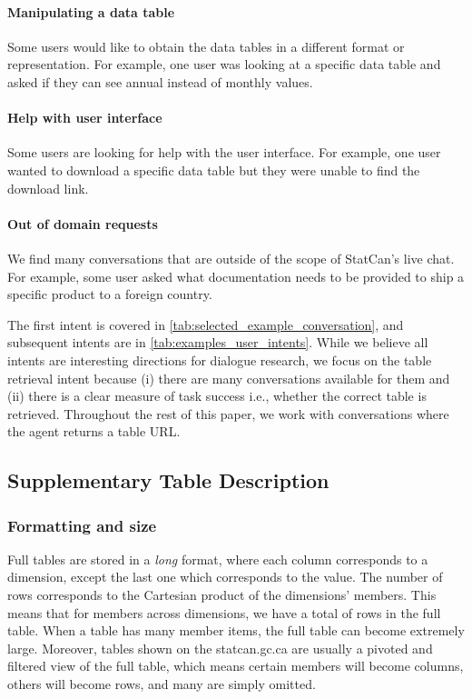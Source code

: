 \documentclass[11pt]{article}
\begin{document}
\paragraph{Manipulating a data table} Some users would like to obtain the data tables in a different format or representation. For example, one user was looking at a specific data table and asked if they can see annual instead of monthly values. 

\paragraph{Help with user interface} Some users are looking for help with the user interface. For example, one user wanted to download a specific data table but they were unable to find the download link. 

\paragraph{Out of domain requests} We find many conversations that are outside of the scope of StatCan's live chat. For example, some user asked what documentation needs to be provided to ship a specific product to a foreign country. 
\newline

The first intent is covered in \autoref{tab:selected_example_conversation}, and subsequent intents are in \autoref{tab:examples_user_intents}. While we believe all intents are interesting directions for dialogue research, we focus on the table retrieval intent because (i) there are many conversations available for them and (ii) there is a clear measure of task success i.e., whether the correct table is retrieved. Throughout the rest of this paper, we work with conversations where the agent returns a table URL. 


\subsection{Supplementary Table Description}

\subsubsection{Formatting and size}
\label{sec:appendix_formatting_size}
Full tables are stored in a \textit{long} format, where each column corresponds to a dimension, except the last one which corresponds to the value. The number of rows corresponds to the Cartesian product of the dimensions' members. This means that for  members across  dimensions, we have a total of  rows in the full table. When a table has many member items, the full table can become extremely large. Moreover, tables shown on the statcan.gc.ca are usually a pivoted and filtered view of the full table, which means certain members will become columns, others will become rows, and many are simply omitted.
\end{document}
